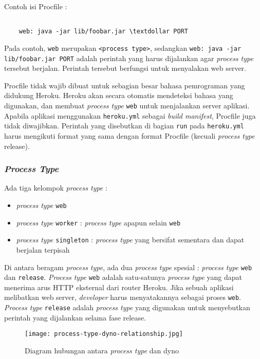 Contoh isi Procfile :
\begin{lstlisting}

	web: java -jar lib/foobar.jar \textdollar PORT

\end{lstlisting}

Pada contoh, \texttt{web} merupakan \texttt{<process type>}, sedangkan \texttt{web: java -jar lib/foobar.jar \textdollar PORT} adalah perintah yang harus dijalankan agar \textit{process type} tersebut berjalan. Perintah tersebut berfungsi untuk menyalakan web server.

Procfile tidak wajib dibuat untuk sebagian besar bahasa pemrograman yang didukung Heroku. Heroku akan secara otomatis mendeteksi bahasa yang digunakan, dan membuat \textit{process type} \texttt{web} untuk menjalankan server aplikasi. Apabila aplikasi menggunakan \texttt{heroku.yml} sebagai \textit{build manifest}, Procfile juga tidak diwajibkan. Perintah yang disebutkan di bagian \texttt{run} pada \texttt{heroku.yml} harus mengikuti format yang sama dengan format Procfile (kecuali \textit{process type} release).


\subsubsection{\textit{Process Type}}
Ada tiga kelompok \textit{process type} : 
\begin{itemize}
\item \textit{process type} \texttt{web}
\item \textit{process type} \texttt{worker} : \textit{process type} apapun selain \texttt{web}
\item \textit{process type} \texttt{singleton} : \textit{process type} yang bersifat sementara dan dapat berjalan terpisah
\end{itemize}

Di antara beragam \textit{process type}, ada dua \textit{process type} spesial : \textit{process type} \texttt{web} dan \texttt{release}. \textit{Process type} \texttt{web} adalah satu-satunya \textit{process type} yang dapat menerima arus HTTP eksternal dari router Heroku. Jika sebuah aplikasi melibatkan web server, \textit{developer} harus menyatakannya sebagai proses \texttt{web}. \textit{Process type} \texttt{release} adalah \textit{process type} yang digunakan untuk menyebutkan perintah yang dijalankan selama fase release.

\begin{figure}[H]
	\centering  
	\texttt{[image: process-type-dyno-relationship.jpg]}  
	\caption[Diagram hubungan antara \textit{process type} dan dyno]{Diagram hubungan antara \textit{process type} dan dyno} 
	\label{fig:process-type-dyno-relationship} 
\end{figure}

